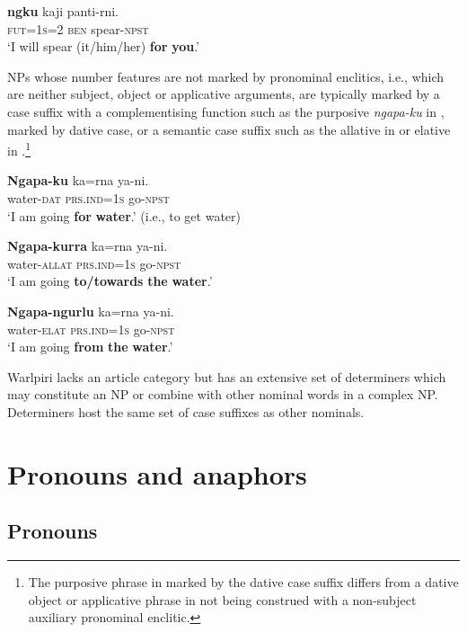 \documentclass[output=paper]{../langscibook}
\begin{document}
\ex
\label{ex:laughren:5b}
\textbf{ngku} kaji  panti-rni.\\
    \textsc{fut=1s=2}  \textsc{ben}  spear-\textsc{npst}\\
\glt `I will spear (it/him/her) \textbf{for} \textbf{you}.'
\z
\z

NPs whose number features are not marked by pronominal enclitics, i.e., which are neither subject, object or applicative arguments, are typically marked by a case suffix with a complementising function such as the purposive \textit{ngapa-ku} in , marked by dative case, or a semantic case suffix such as the allative in  or elative in .\footnote{The purposive phrase in  marked by the dative case suffix differs from a dative object or applicative phrase in not being construed with a non-subject auxiliary pronominal enclitic.}

\ea%
    \label{ex:laughren:6}
\ea
\label{ex:laughren:6a}
\gll \textbf{Ngapa-ku}  ka=rna  ya-ni.\\
    water-\textsc{dat}  \textsc{prs.ind=1s} go-\textsc{npst}\\
  \glt `I am going \textbf{for} \textbf{water}.' (i.e., to get water)

\ex
\label{ex:laughren:6b}
\gll \textbf{{Ngapa-kurra}} ka=rna  ya-ni.\\
    water-\textsc{allat}  \textsc{prs.ind=1s}  go-\textsc{npst}\\
\glt `I am going \textbf{to/towards} \textbf{the} \textbf{water}.'

\ex
\label{ex:laughren:6c}
\gll \textbf{{Ngapa-ngurlu}} ka=rna  ya-ni.\\
    water-\textsc{elat}  \textsc{prs.ind=1s}  go-\textsc{npst}\\

\glt `I am going \textbf{from} \textbf{the} \textbf{water}.'
\z
\z


Warlpiri lacks an article category but has an extensive set of determiners which may constitute an NP or combine with other nominal words in a complex NP. Determiners host the same set of case suffixes as other nominals.

\section{Pronouns and anaphors}\label{sec:laughren:2}

\subsection{Pronouns}\label{sec:laughren:2.1}
\end{document}
